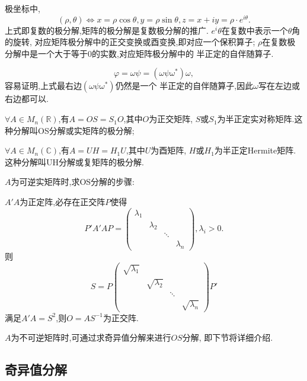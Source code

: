   \begin{remark}
    极坐标中,
    \[
    (\rho,\theta) \Longleftrightarrow x=\rho\cos\theta, y=\rho\sin\theta,
    z = x+iy=\rho\cdot e^{i\theta}.
    \]
   上式即复数的极分解,矩阵的极分解是复数极分解的推广.
   $e^i\theta$在复数中表示一个$\theta$角的旋转,
   对应矩阵极分解中的正交变换或酉变换,即对应一个保积算子;
   $\rho$在复数极分解中是一个大于等于0的实数,对应矩阵极分解中的
   半正定的自伴随算子.

   \[
   \varphi = \omega\psi = (\omega\psi\omega^*)\omega,
   \]
   容易证明,上式最右边$(\omega\psi\omega^*)$仍然是一个
   半正定的自伴随算子,因此$\omega$写在左边或右边都可以.
  \end{remark}

  \begin{deduction}
    $\forall A\in M_n(\mathbb{R})$,有$A=OS=S_1O$,其中$O$为正交矩阵,
    $S$或$S_1$为半正定实对称矩阵.这种分解叫OS分解或实矩阵的极分解;

    $\forall A\in M_n(\mathbb{C})$,有$A=UH=H_1U$,其中$U$为酉矩阵,
    $H$或$H_1$为半正定Hermite矩阵.这种分解叫UH分解或复矩阵的极分解.
  \end{deduction}

  \begin{remark}
    $A$为可逆实矩阵时,求OS分解的步骤:

    $A'A$为正定阵,必存在正交阵$P$使得
    \[
    P'A'AP=\begin{pmatrix}
      \lambda_1 & & &\\
      & \lambda_2 & &\\
      & & \ddots &\\
      & & & \lambda_n
    \end{pmatrix}, \lambda_i>0.
    \]
    则
    \[
    S=P\begin{pmatrix}
      \sqrt{\lambda_1} & & &\\
      & \sqrt{\lambda_2} & &\\
      & & \ddots &\\
      & & & \sqrt{\lambda_n}
    \end{pmatrix}P'
    \]
    满足$A'A=S^2$,则$O=AS^{-1}$为正交阵.

    $A$为不可逆矩阵时,可通过求奇异值分解来进行$OS$分解,
    即下节将详细介绍.
  \end{remark}

  \subsection{奇异值分解}

